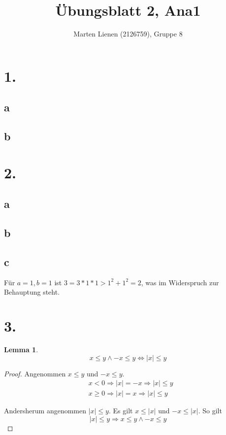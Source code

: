 \documentclass[a4paper,10pt]{article}
\title{Übungsblatt 2, Ana1}
\author{Marten Lienen (2126759), Gruppe 8}
\newtheorem*{lemma}{Lemma}
\begin{document}
\maketitle

\section*{1.}

\subsection*{a}



\subsection*{b}

\section*{2.}

\subsection*{a}

\subsection*{b}

\subsection*{c}

Für $a = 1, b = 1$ ist $3 = 3 * 1 * 1 > 1^2 + 1^2 = 2$, was im Widerspruch zur Behauptung steht.

\section*{3.}

\begin{lemma}
 \begin{equation*}
  x \le y \land -x \le y \Leftrightarrow |x| \le y
 \end{equation*}
\end{lemma}

\begin{proof}
 Angenommen $x \le y$ und $-x \le y$.
 \begin{align*}
  & x < 0 \Rightarrow |x| = -x \Rightarrow |x| \le y\\
  & x \ge 0 \Rightarrow |x| = x \Rightarrow |x| \le y
 \end{align*}

 Andersherum angenommen $|x| \le y$. Es gilt $x \le |x|$ und $-x \le |x|$. So gilt
 \begin{equation*}
  |x| \le y \Rightarrow x \le y \land -x \le y
 \end{equation*}
\end{proof}
\end{document}
